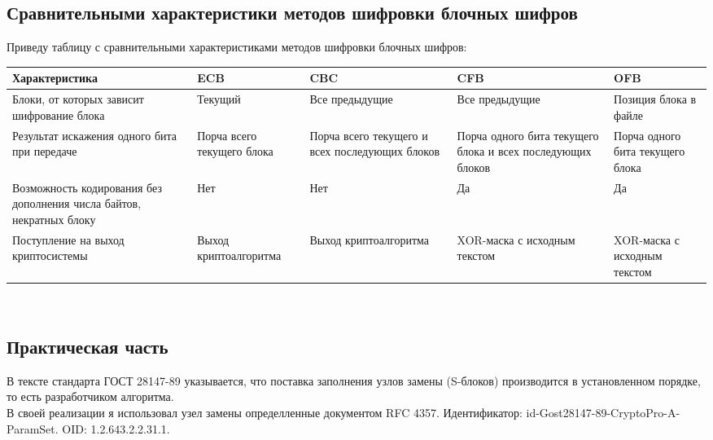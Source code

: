 \documentclass[oneside,final,14pt]{extreport}
\begin{document}
\begin{center}
\subsection{Сравнительными характеристики методов шифровки блочных шифров}
 \end{center}
 
Приведу таблицу с сравнительными характеристиками методов шифровки блочных шифров:\\



\begin{tabular}{|p{5cm}|p{3cm}|p{3cm}|p{3cm}|p{3cm}|}
\hline 
Характеристика & ECB & CBC & CFB & OFB \\ 
\hline 
Блоки, от
которых зависит
шифрование
блока & Текущий & Все предыдущие & Все предыдущие & Позиция блока в файле \\ 
\hline 
Результат
искажения
одного бита при
передаче & Порча всего текущего блока & Порча всего текущего и всех последующих блоков & Порча одного бита текущего блока и всех последующих блоков & Порча одного бита текущего блока \\ 
\hline 
Возможность
кодирования без
дополнения
числа байтов, 
некратных блоку & Нет & Нет & Да & Да \\ 
\hline 
Поступление на выход криптосистемы & Выход криптоалгоритма & Выход криптоалгоритма & XOR-маска с исходным текстом & XOR-маска с исходным текстом \\ 
\hline 
\end{tabular} 



~\



\begin{center}
\section{Практическая часть}
 \end{center}



В тексте стандарта ГОСТ 28147-89 указывается, что поставка заполнения узлов замены (S-блоков) производится в установленном порядке, то есть разработчиком алгоритма.  \\


В своей реализации я использовал узел замены определленные документом RFC 4357. Идентификатор: id-Gost28147-89-CryptoPro-A-ParamSet. OID: 1.2.643.2.2.31.1.\\
\end{document}
